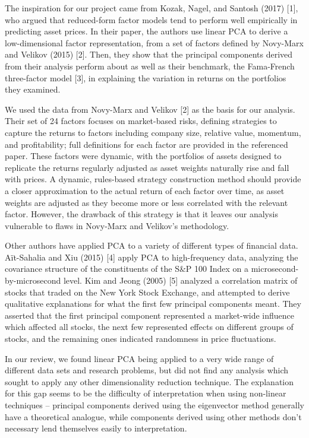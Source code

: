 \documentclass[a4paper]{article}
\begin{document}
   The inspiration for our project came from Kozak, Nagel, and Santosh (2017) [1], who argued that reduced-form factor models tend to perform well empirically in predicting asset prices. In their paper, the authors use linear PCA to derive a low-dimensional factor representation, from a set of factors defined by Novy-Marx and Velikov (2015) [2]. Then, they show that the principal components derived from their analysis perform about as well as their benchmark, the Fama-French three-factor model [3], in explaining the variation in returns on the portfolios they examined.
   \par We used the data from Novy-Marx and Velikov [2] as the basis for our analysis. Their set of 24 factors focuses on market-based risks, defining strategies to capture the returns to factors including company size, relative value, momentum, and profitability; full definitions for each factor are provided in the referenced paper. These factors were dynamic, with the portfolios of assets designed to replicate the returns regularly adjusted as asset weights naturally rise and fall with prices. A dynamic, rules-based strategy construction method should provide a closer approximation to the actual return of each factor over time, as asset weights are adjusted as they become more or less correlated with the relevant factor. However, the drawback of this strategy is that it leaves our analysis vulnerable to flaws in Novy-Marx and Velikov's methodology. 
   \par Other authors have applied PCA to a variety of different types of financial data. A\"{i}t-Sahalia and Xiu (2015) [4] apply PCA to high-frequency data, analyzing the covariance structure of the constituents of the S\&P 100 Index on a microsecond-by-microsecond level. Kim and Jeong (2005) [5] analyzed a correlation matrix of stocks that traded on the New York Stock Exchange, and attempted to derive qualitative explanations for what the first few principal components meant. They asserted that the first principal component represented a market-wide influence which affected all stocks, the next few represented effects on different groups of stocks, and the remaining ones indicated randomness in price fluctuations.
   \par In our review, we found linear PCA being applied to a very wide range of different data sets and research problems, but did not find any analysis which sought to apply any other dimensionality reduction technique. The explanation for this gap seems to be the difficulty of interpretation when using non-linear techniques -- principal components derived using the eigenvector method generally have a theoretical analogue, while components derived using other methods don't necessary lend themselves easily to interpretation.
   
\end{document}
